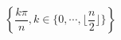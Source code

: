 \begin{displaymath}
\left\lbrace
 \frac{k\pi}{n}, k\in\{0, \cdots ,\lfloor \frac{n}{2}\rfloor\}
\right\rbrace 
\end{displaymath}
